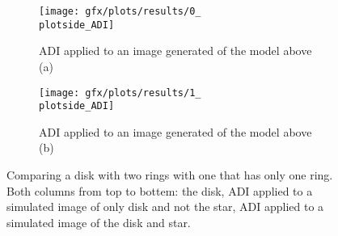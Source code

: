 \begin{figure}[h!]
{\begin{minipage}[t]{1.2\textwidth}
      \begin{subfigure}[t]{0.6\textwidth}
        \texttt{[image: gfx/plots/results/0\_\\plotside\_ADI]}
        \caption{\ac{ADI} applied to an image generated of the model above (a)}
        \label{fig:disk0_3}
      \end{subfigure}%
      \begin{subfigure}[t]{0.6\textwidth}
        \texttt{[image: gfx/plots/results/1\_\\plotside\_ADI]}
        \caption{\ac{ADI} applied to an image generated of the model above (b)}
        \label{fig:disk1_3}
      \end{subfigure}
  \end{minipage}
  }%

  \caption{Comparing a disk with two rings with one that has only one ring. Both columns from top to bottem: the disk, \ac{ADI} applied to a simulated image of only disk and not the star, \ac{ADI} applied to a simulated image of the disk and star.}
  \label{fig:comp_numb_rings}
\end{figure}

